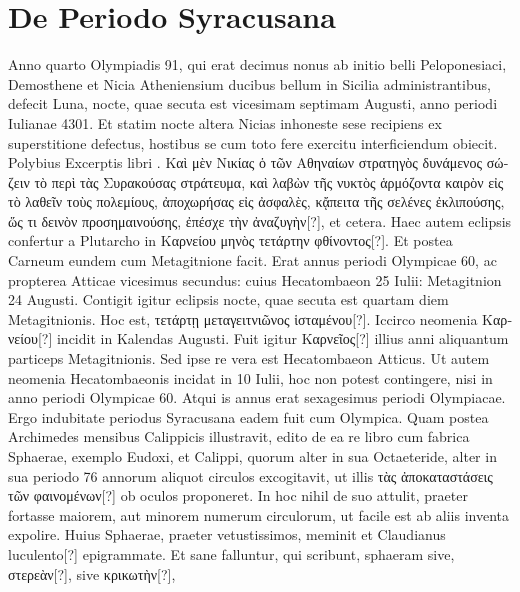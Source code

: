 \section{De Periodo Syracusana}
Anno quarto Olympiadis 91, qui erat decimus nonus ab initio
belli Peloponesiaci, Demosthene et Nicia Atheniensium ducibus
bellum in Sicilia administrantibus, defecit Luna, nocte,
quae secuta est vicesimam septimam Augusti, anno periodi Iulianae
4301.
Et statim nocte altera Nicias inhoneste sese recipiens
ex superstitione defectus, hostibus se cum toto fere exercitu interficiendum
obiecit.
Polybius Excerptis libri .
\textgreek{Καὶ μὲν Νικίας ὁ
τῶν Αθηναίων στρατηγὸς δυνάμενος σώζειν τὸ περὶ τὰς Συρακούσας στράτευμα,
καὶ λαβὼν τῆς νυκτὸς ἁρμόζοντα καιρὸν εἰς τὸ λαθεῖν τοὺς πολεμίους,
ἀποχωρήσας εἰς ἀσφαλὲς, κᾄπειτα τῆς σελένες ἐκλιπούσης, ὥς τι δεινὸν
προσημαινούσης, ἐπέσχε τὴν ἀναζυγὴν[?]}, et cetera.
Haec autem eclipsis confertur
a Plutarcho in \textgreek{Καρνείου μηνὸς τετάρτην φθίνοντος[?]}.
Et postea
Carneum eundem cum Metagitnione facit.
Erat annus periodi Olympicae
60, ac propterea Atticae vicesimus secundus: cuius Hecatombaeon
25 Iulii: Metagitnion 24 Augusti.
Contigit igitur
eclipsis nocte, quae secuta est quartam diem Metagitnionis.
Hoc
est, \textgreek{τετάρτῃ μεταγειτνιῶνος ἱσταμένου[?]}.
Iccirco neomenia \textgreek{Καρνείου[?]} incidit
in Kalendas Augusti.
Fuit igitur \textgreek{Καρνεῖος[?]} illius anni aliquantum
particeps Metagitnionis.
Sed ipse re vera est Hecatombaeon
Atticus.
Ut autem neomenia Hecatombaeonis incidat in 10 Iulii,
hoc non potest contingere, nisi in anno periodi Olympicae 60.
Atqui
is annus erat sexagesimus periodi Olympiacae.
Ergo indubitate
periodus Syracusana eadem fuit cum Olympica.
Quam postea
Archimedes mensibus Calippicis illustravit, edito de ea re libro
cum fabrica Sphaerae, exemplo Eudoxi, et Calippi, quorum alter
in sua Octaeteride, alter in sua periodo 76 annorum aliquot
circulos excogitavit, ut illis
 \textgreek{τὰς ἀποκαταστάσεις τῶν φαινομένων[?]} ob oculos
proponeret.
In hoc nihil de suo attulit, praeter fortasse maiorem,
aut minorem numerum circulorum, ut facile est ab aliis inventa expolire.
Huius Sphaerae, praeter vetustissimos, meminit et Claudianus
luculento[?] epigrammate.
%
Et sane falluntur, qui scribunt, sphaeram
sive, \textgreek{στερεὰν[?]}, sive \textgreek{κρικωτὴν[?]},
